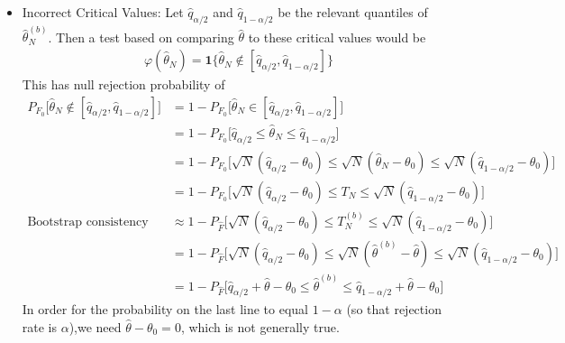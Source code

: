 \documentclass[12pt]{article}
\theoremstyle{plain}
\theoremstyle{definition}
\theoremstyle{remark}
\begin{document}
\begin{itemize}
  \item
    Incorrect Critical Values:
    Let $\hat{q}_{\alpha/2}$ and $\hat{q}_{1-\alpha/2}$ be the relevant
    quantiles of $\hat{\theta}_N^{(b)}$.
    Then a test based on comparing $\hat{\theta}$ to these critical
    values would be
    \begin{align*}
      \varphi(\hat{\theta}_N)
      =
      \mathbf{1}\{\hat{\theta}_N\not\in [\hat{q}_{\alpha/2},\hat{q}_{1-\alpha/2}]\}
    \end{align*}
    This has null rejection probability of
    \begin{align*}
      P_{F_0}\big[
        \hat{\theta}_N\not\in [\hat{q}_{\alpha/2},\hat{q}_{1-\alpha/2}]
      \big]
      &=
      1-
      P_{F_0}\big[
        \hat{\theta}_N\in [\hat{q}_{\alpha/2},\hat{q}_{1-\alpha/2}]
      \big]
      \\
      &=
      1-
      P_{F_0}\big[
        \hat{q}_{\alpha/2}
        \leq
        \hat{\theta}_N
        \leq
        \hat{q}_{1-\alpha/2}
      \big]
      \\
      &=
      1-
      P_{F_0}\big[
        \sqrt{N}(\hat{q}_{\alpha/2}-\theta_0)
        \leq
        \sqrt{N}(\hat{\theta}_N-\theta_0)
        \leq
        \sqrt{N}(\hat{q}_{1-\alpha/2}-\theta_0)
      \big]
      \\
      &=
      1-
      P_{F_0}\big[
        \sqrt{N}(\hat{q}_{\alpha/2}-\theta_0)
        \leq
        T_N
        \leq
        \sqrt{N}(\hat{q}_{1-\alpha/2}-\theta_0)
      \big]
      \\
      \text{Bootstrap consistency}
      \quad
      &\approx
      1-
      P_{\hat{F}}\big[
        \sqrt{N}(\hat{q}_{\alpha/2}-\theta_0)
        \leq
        T_N^{(b)}
        \leq
        \sqrt{N}(\hat{q}_{1-\alpha/2}-\theta_0)
      \big]
      \\
      &=
      1-
      P_{\hat{F}}\big[
        \sqrt{N}(\hat{q}_{\alpha/2}-\theta_0)
        \leq
        \sqrt{N}(\hat{\theta}^{(b)}-\hat{\theta})
        \leq
        \sqrt{N}(\hat{q}_{1-\alpha/2}-\theta_0)
      \big]
      \\
      &=
      1-
      P_{\hat{F}}\big[
        \hat{q}_{\alpha/2}
        + \hat{\theta} -\theta_0
        \leq
        \hat{\theta}^{(b)}
        \leq
        \hat{q}_{1-\alpha/2}
        + \hat{\theta} -\theta_0
      \big]
    \end{align*}
    In order for the probability on the last line to equal $1-\alpha$
    (so that rejection rate is $\alpha$),we need
    $\hat{\theta}-\theta_0=0$, which is not generally true.



\end{itemize}
\end{document}
